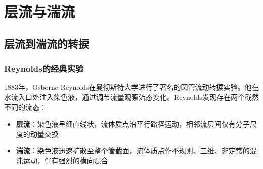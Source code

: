 \chapter{层流与湍流}


\section{层流到湍流的转捩}

\subsection{Reynolds的经典实验}

1883年，Osborne Reynolds在曼彻斯特大学进行了著名的圆管流动转捩实验。他在水流入口处注入染色液，通过调节流量观察流态变化。Reynolds发现存在两个截然不同的流态：

\begin{itemize}
    \item \textbf{层流}：染色液呈细直线状，流体质点沿平行路径运动，相邻流层间仅有分子尺度的动量交换
    \item \textbf{湍流}：染色液迅速扩散至整个管截面，流体质点作不规则、三维、非定常的混沌运动，伴有强烈的横向混合
\end{itemize}

